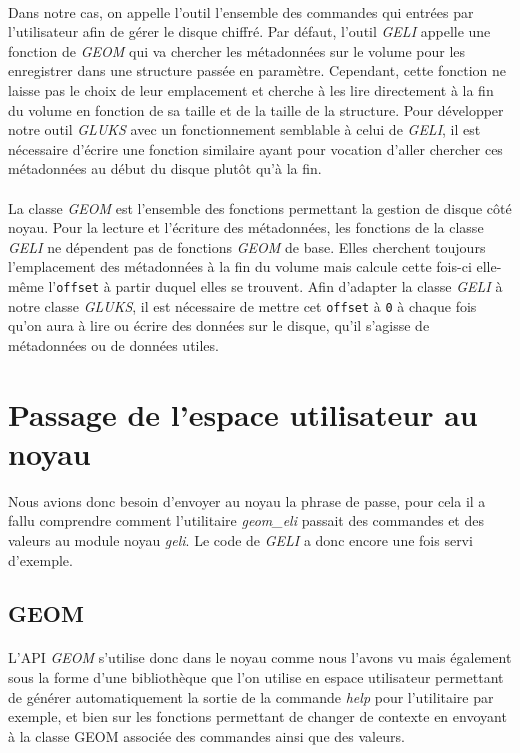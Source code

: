 \paragraph{}
Dans notre cas, on appelle l'outil l'ensemble des commandes qui entrées par
l'utilisateur afin de gérer le disque chiffré. Par défaut, l'outil \textit{GELI}
appelle une fonction de \textit{GEOM} qui va chercher les métadonnées sur le
volume pour les enregistrer dans une structure passée en paramètre. Cependant,
cette fonction ne laisse pas le choix de leur emplacement et cherche à les lire
directement à la fin du volume en fonction de sa taille et de la taille de la
structure. Pour développer notre outil \textit{GLUKS} avec un fonctionnement
semblable à celui de \textit{GELI}, il est nécessaire d'écrire une fonction
similaire ayant pour vocation d'aller chercher ces métadonnées au début du
disque plutôt qu'à la fin.
\paragraph{}
La classe \textit{GEOM} est l'ensemble des fonctions permettant la gestion de
disque côté noyau. Pour la lecture et l'écriture des métadonnées, les fonctions
de la classe \textit{GELI} ne dépendent pas de fonctions \textit{GEOM} de base.
Elles cherchent toujours l'emplacement des métadonnées à la fin du volume mais
calcule cette fois-ci elle-même l'\texttt{offset} à partir duquel elles se
trouvent. Afin d'adapter la classe \textit{GELI} à notre classe \textit{GLUKS},
il est nécessaire de mettre cet \texttt{offset} à \texttt{0} à chaque fois qu'on
aura à lire ou écrire des données sur le disque, qu'il s'agisse de métadonnées
ou de données utiles. 

\section{Passage de l'espace utilisateur au noyau}
Nous avions donc besoin d'envoyer au noyau la phrase de passe, pour cela il a
fallu comprendre comment l'utilitaire {\em geom\_eli} passait des commandes et
des valeurs au module noyau {\em geli}. Le code de {\em GELI} a donc encore une
fois servi d'exemple.

\subsection{GEOM}
\paragraph{}
L'API {\em GEOM} s'utilise donc dans le noyau comme nous l'avons vu mais
également sous la forme d'une bibliothèque que l'on utilise en espace
utilisateur permettant de générer automatiquement la sortie de la commande 
{\em help} pour l'utilitaire par exemple, et bien sur les fonctions permettant
de changer de contexte en envoyant à la classe GEOM associée des commandes ainsi
que des valeurs.

